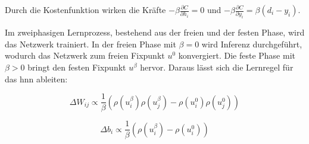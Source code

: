 Durch die Kostenfunktion wirken die Kräfte \(-\beta\frac{\partial C}{\partial h_i}=0\) und \(-\beta\frac{\partial C}{\partial y_i}=\beta(d_i-y_i)\).

Im zweiphasigen Lernprozess, bestehend aus der freien und der festen Phase, wird das Netzwerk trainiert. In der freien Phase mit \(\beta=0\) wird Inferenz durchgeführt, wodurch das Netzwerk zum freien Fixpunkt \(u^0\) konvergiert. Die feste Phase mit \(\beta>0\) bringt den festen Fixpunkt \(u^\beta\) hervor. Daraus lässt sich die Lernregel für das \ac{hnn} ableiten:

\[\Delta W_{ij}\propto\frac{1}{\beta}\left(\rho(u_i^\beta)\rho(u_j^\beta)-\rho(u_i^0)\rho(u_j^0)\right)\]

\[\Delta b_i\propto\frac{1}{\beta}\left(\rho(u_i^\beta)-\rho(u_i^0)\right)\]
